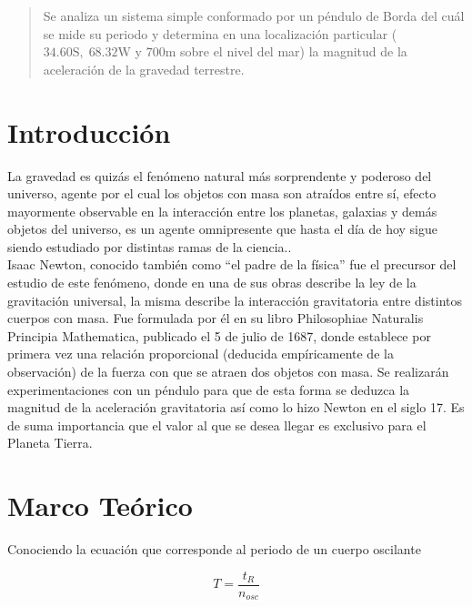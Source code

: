 \documentclass[a4paper,twocolumn]{article}
\author{Bichir Cisneros, Francisco\\
\texttt{franbichir@gmail.com}
\and
Medrano, Lautaro\\
\texttt{lautaromedrano10@hotmail.com}\\
\and
Villarroel Facundo\\
\texttt{facu99.fv@gmail.com}
\\
\\
UTN FRSR\textendash{}Urquiza 316\textendash{}Comisión N$^\circ$~1}
\begin{document}
\maketitle

\begin{abstract}
    Se analiza un sistema simple conformado por un péndulo de Borda\cite{b1} del cuál se mide su periodo\cite{b2} y determina en una localización particular ($34.60 \text{S},\;68.32\text{W}$ y $700\text{m}$ sobre el nivel del mar) la magnitud de la aceleración de la gravedad terrestre.
\end{abstract}

\section{Introducción}

La gravedad es quizás el fenómeno natural más sorprendente y poderoso del universo\cite{b3}, agente por el cual  los objetos con masa son atraídos entre sí, efecto mayormente observable en la interacción entre los planetas, galaxias y demás objetos del universo, es un agente omnipresente que hasta el día de hoy sigue siendo estudiado por distintas ramas de la ciencia.\cite{b4}.\\

Isaac Newton\cite{b5}, conocido también como “el padre de la física” fue el precursor del estudio de este fenómeno, donde en una de sus obras describe la ley de la gravitación universal\cite{b6}, la misma describe la interacción gravitatoria entre distintos cuerpos con masa. Fue formulada por él en su libro Philosophiae Naturalis Principia Mathematica\cite{b6}, publicado el 5 de julio de 1687, donde establece por primera vez una relación proporcional (deducida empíricamente de la observación) de la fuerza con que se atraen dos objetos con masa.
Se realizarán experimentaciones con un péndulo para que de esta forma se deduzca la magnitud de la aceleración gravitatoria así como lo hizo Newton en el siglo 17. Es de suma importancia que el valor al que se desea llegar es exclusivo para el Planeta Tierra.\cite{b7}

\section{Marco Teórico}

Conociendo la ecuación que corresponde al periodo de un cuerpo oscilante\cite{b2}

\begin{large}
    \begin{equation} \label{e3}
        T=\frac{t_{R}}{n_{osc}}
    \end{equation}
\end{large}
\end{document}
